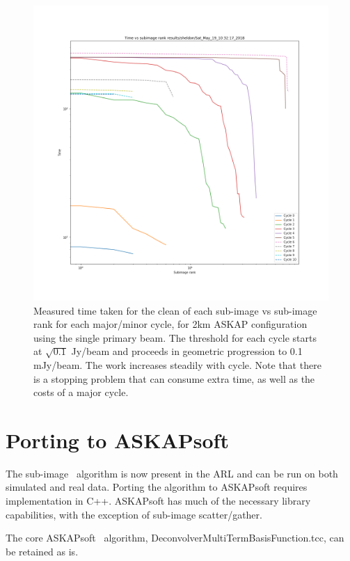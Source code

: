 \documentclass[11pt,a4paper,variablewidth]{article}
\begin{document}
\begin{figure}[h]
  \centering
  \includegraphics[width=\textwidth]{./pngs/time_versus_rank.png}
  \caption{Measured time taken for the clean of each sub-image vs sub-image rank for each major/minor cycle, for 2km ASKAP configuration using the single primary beam. The threshold for each cycle starts at $\sqrt{0.1}$ Jy/beam and proceeds in geometric progression to 0.1 mJy/beam. The work increases steadily with cycle. Note that there is a stopping problem that can consume extra time, as well as the costs of a major cycle.}
  \label{fig:time_vs_rank}
\end{figure}

\pagebreak
\section{Porting to ASKAPsoft}

The sub-image \MAM\ algorithm is now present in the ARL and can be run on both simulated and real data. Porting the algorithm to ASKAPsoft requires implementation in C++. ASKAPsoft has much of the necessary library capabilities, with the exception of sub-image scatter/gather.

The core ASKAPsoft \MAM\ algorithm, DeconvolverMultiTermBasisFunction.tcc, can be retained as is.
\end{document}
